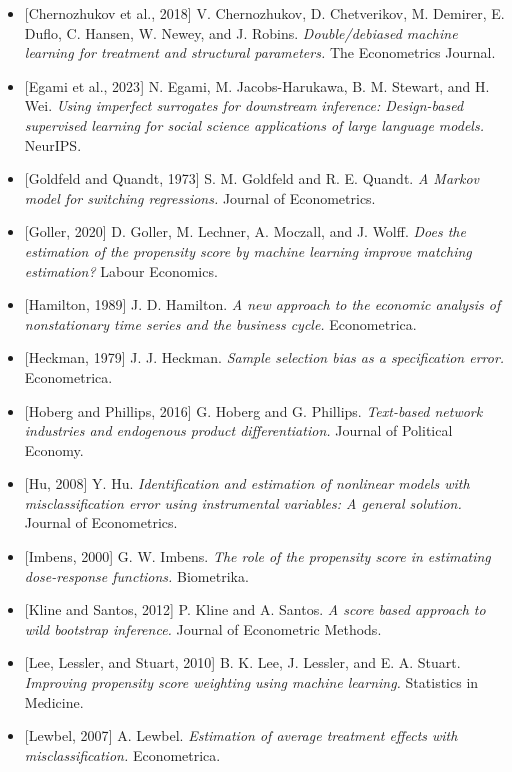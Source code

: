 \documentclass[
  12pt,
  letterpaper]{article}
\begin{document}
\begin{itemize}
{  with clustered errors.} Review of Economics and Statistics.
\item
  {[}Chernozhukov et al., 2018{]} V. Chernozhukov, D. Chetverikov, M.
  Demirer, E. Duflo, C. Hansen, W. Newey, and J. Robins.
  \emph{Double/debiased machine learning for treatment and structural
  parameters.} The Econometrics Journal.
\item
  {[}Egami et al., 2023{]} N. Egami, M. Jacobs-Harukawa, B. M. Stewart,
  and H. Wei. \emph{Using imperfect surrogates for downstream inference:
  Design-based supervised learning for social science applications of
  large language models.} NeurIPS.
\item
  {[}Goldfeld and Quandt, 1973{]} S. M. Goldfeld and R. E. Quandt.
  \emph{A Markov model for switching regressions.} Journal of
  Econometrics.
\item
  {[}Goller, 2020{]} D. Goller, M. Lechner, A. Moczall, and J. Wolff.
  \emph{Does the estimation of the propensity score by machine learning
  improve matching estimation?} Labour Economics.
\item
  {[}Hamilton, 1989{]} J. D. Hamilton. \emph{A new approach to the
  economic analysis of nonstationary time series and the business
  cycle.} Econometrica.
\item
  {[}Heckman, 1979{]} J. J. Heckman. \emph{Sample selection bias as a
  specification error.} Econometrica.
\item
  {[}Hoberg and Phillips, 2016{]} G. Hoberg and G. Phillips.
  \emph{Text-based network industries and endogenous product
  differentiation.} Journal of Political Economy.
\item
  {[}Hu, 2008{]} Y. Hu. \emph{Identification and estimation of nonlinear
  models with misclassification error using instrumental variables: A
  general solution.} Journal of Econometrics.
\item
  {[}Imbens, 2000{]} G. W. Imbens. \emph{The role of the propensity
  score in estimating dose-response functions.} Biometrika.
\item
  {[}Kline and Santos, 2012{]} P. Kline and A. Santos. \emph{A score
  based approach to wild bootstrap inference.} Journal of Econometric
  Methods.
\item
  {[}Lee, Lessler, and Stuart, 2010{]} B. K. Lee, J. Lessler, and E. A.
  Stuart. \emph{Improving propensity score weighting using machine
  learning.} Statistics in Medicine.
\item
  {[}Lewbel, 2007{]} A. Lewbel. \emph{Estimation of average treatment
  effects with misclassification.} Econometrica.

\end{itemize}
\end{document}

